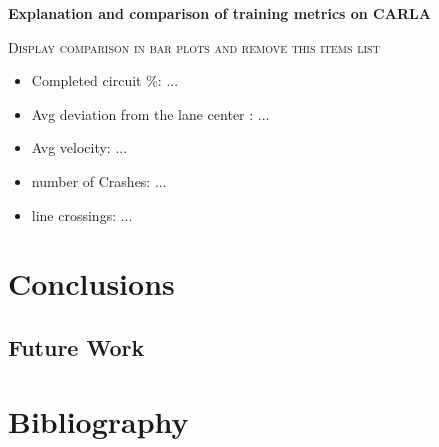 \documentclass[conference]{IEEEtran}
\begin{document}
\textbf{Explanation and comparison of training metrics on CARLA}

\textsc{Display comparison in bar plots and remove this items list}
\begin{itemize}
    \item Completed circuit \%: ...
    \item Avg deviation from the lane center : ...
    \item Avg velocity: ...
    \item number of Crashes: ...
    \item line crossings: ...
\end{itemize}

\section{Conclusions}

\subsection{Future Work}

\section{Bibliography}
\end{document}
